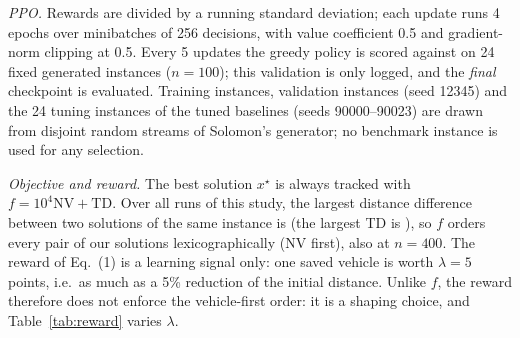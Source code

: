 \emph{PPO.} Rewards are divided by a running standard deviation; each update runs 4 epochs over minibatches of 256
decisions, with value coefficient 0.5 and gradient-norm clipping at 0.5. Every 5 updates the greedy policy is scored
against \Rw{} on 24 fixed generated instances ($n=100$); this validation is only logged, and the \emph{final}
checkpoint is evaluated. Training instances, validation instances (seed 12345) and the 24 tuning instances of the
tuned baselines (seeds 90000--90023) are drawn from disjoint random streams of Solomon's generator; no benchmark
instance is used for any selection.

\emph{Objective and reward.} The best solution $x^\star$ is always tracked with $f=10^4\mathrm{NV}+\mathrm{TD}$. Over
all \qLexRuns{} runs of this study, the largest distance difference between two solutions of the same instance is
\qLexRange{} (the largest TD is \qLexTdMax{}), so $f$ orders every pair of our solutions lexicographically (NV first),
also at $n=400$. The reward of Eq.~(1) is a learning signal only: one saved vehicle is worth $\lambda=5$ points,
i.e.\ as much as a 5\% reduction of the initial distance. Unlike $f$, the reward therefore does not enforce the
vehicle-first order: it is a shaping choice, and Table~\ref{tab:reward} varies $\lambda$.
